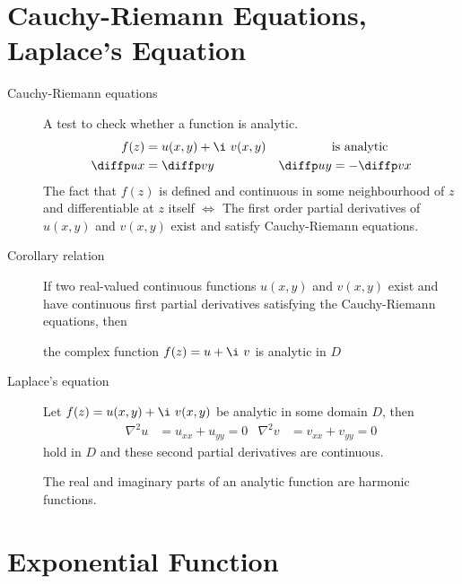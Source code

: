 \section{Cauchy-Riemann Equations, Laplace's Equation}

\begin{description}
    \item[Cauchy-Riemann equations] A test to check whether a function is analytic.
        \begin{align}
            f(z)      & = u(x, y) + \i\ v(x, y) &
                      & \text{is analytic}        \\
            \diffp ux & = \diffp vy             &
            \diffp uy & = -\diffp vx
        \end{align}
        The fact that $ f(z) $ is defined and continuous in some neighbourhood of
        $ z $ and differentiable at $ z $ itself $ \iff $
        The first order partial derivatives of $ u(x, y) $ and $ v(x, y) $ exist and
        satisfy Cauchy-Riemann equations.

    \item[Corollary relation] If two real-valued continuous functions $ u(x, y) $
        and $ v(x, y) $ exist and have continuous first partial derivatives satisfying
        the Cauchy-Riemann equations, then \par
        the complex function $ f(z) = u + \i\ v $ is analytic in $ D $

    \item[Laplace's equation] Let $ f(z) = u(x, y) + \i\ v(x, y) $ be analytic in some
        domain $ D $, then
        \begin{align}
            \nabla^2 u & = u_{xx} + u_{yy} = 0 &
            \nabla^2 v & = v_{xx} + v_{yy} = 0
        \end{align}
        hold in $ D $ and these second partial derivatives are continuous. \par
        The real and imaginary parts of an analytic function are harmonic functions.
\end{description}

\section{Exponential Function}

